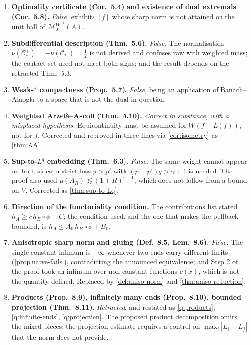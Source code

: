 \documentclass[11pt,a4paper]{article}
\numberwithin{equation}{section}
\theoremstyle{plain}
\theoremstyle{definition}
\theoremstyle{remark}
\newcommand{\Msp}{\mathcal{M}}
\begin{document}
\begin{enumerate}
\item \textbf{Optimality certificate (Cor.~5.4) and existence of dual extremals
(Cor.~5.8).} \emph{False.}  exhibits $[f]$ whose sharp norm is not
attained on the unit ball of $\Msp_0^{W^{-1}}(A)$.

\item \textbf{Subdifferential description (Thm.~5.6).} \emph{False.} The normalisation
$\nu(\mathcal{C}^{+}_\ast)=-\nu(\mathcal{C}^{-}_\ast)=\tfrac12$ is not derived and confuses
raw with weighted mass; the contact set need not meet both signs; and the result depends on
the retracted Thm.~5.3.

\item \textbf{Weak-$*$ compactness (Prop.~5.7).} \emph{False}, being an application of
Banach--Alaoglu to a space that is not the dual in question.

\item \textbf{Weighted Arzel\`a--Ascoli (Thm.~5.10).} \emph{Correct in substance, with a
misplaced hypothesis.} Equicontinuity must be assumed for $W(f-L(f))$, not for $f$.
Corrected and reproved in three lines via \cref{cor:isometry} as \cref{thm:AA}.

\item \textbf{Sup-to-$L^q$ embedding (Thm.~6.3).} \emph{False.} The same weight cannot
appear on both sides; a strict loss $p>p'$ with $(p-p')q>\gamma+1$ is needed. The proof
also used $\mu(A_R)\lesssim(1+R)^{\gamma-1}$, which does not follow from a bound on $V$.
Corrected as \cref{thm:sup-to-Lq}.

\item \textbf{Direction of the functoriality condition.} The contributions list stated
$h_A\ge c\,h_B\circ\phi-C$; the condition used, and the one that makes the pullback
bounded, is $h_A\le A_0\,h_B\circ\phi+B_0$.

\item \textbf{Anisotropic sharp norm and gluing (Def.~8.5, Lem.~8.6).} \emph{False.}
The single-constant infimum is $+\infty$ whenever two ends carry different limits
(\cref{prop:naive-fails}), contradicting the announced equivalence; and Step 2 of the proof
took an infimum over non-constant functions $c(x)$, which is not the quantity defined.
Replaced by \cref{def:aniso-norm} and \cref{thm:aniso-reduction}.

\item \textbf{Products (Prop.~8.9), infinitely many ends (Prop.~8.10), bounded projection
(Thm.~8.11).} \emph{Retracted}, and restated as \cref{q:products},
\cref{q:infinite-ends}, \cref{q:projection}. The proposed product decomposition omits the
mixed pieces; the projection estimate requires a control on $\max_i|L_i-L_j|$ that the norm
does not provide.


\end{enumerate}
\end{document}
